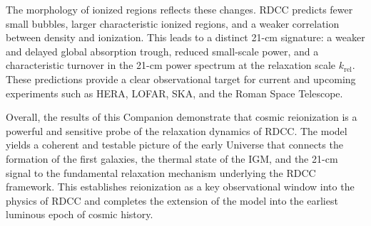\documentclass[11pt,a4paper]{article}
\begin{document}
The morphology of ionized regions reflects these changes. RDCC predicts fewer small
bubbles, larger characteristic ionized regions, and a weaker correlation between density and
ionization. This leads to a distinct 21-cm signature: a weaker and delayed global absorption
trough, reduced small-scale power, and a characteristic turnover in the 21-cm power spectrum
at the relaxation scale $k_{\mathrm{rel}}$. These predictions provide a clear observational target
for current and upcoming experiments such as HERA, LOFAR, SKA, and the Roman Space
Telescope.

Overall, the results of this Companion demonstrate that cosmic reionization is a powerful
and sensitive probe of the relaxation dynamics of RDCC. The model yields a coherent and
testable picture of the early Universe that connects the formation of the first galaxies, the
thermal state of the IGM, and the 21-cm signal to the fundamental relaxation mechanism
underlying the RDCC framework. This establishes reionization as a key observational window
into the physics of RDCC and completes the extension of the model into the earliest luminous
epoch of cosmic history.
\end{document}
